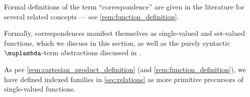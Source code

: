 \begin{comments}
  \item Formal definitions of the term \enquote{correspondence} are given in the literature for several related concepts --- see \cref{rem:function_definition}.

  \item Formally, correspondences manifest themselves as single-valued and set-valued functions, which we discuss in this section, as well as the purely syntactic \( \muplambda \)-term abstractions discussed in .

  As per \cref{rem:cartesian_product_definition} (and \cref{rem:function_definition}), we have defined indexed families in \cref{sec:relations} as more primitive precursors of single-valued functions.
\end{comments}

